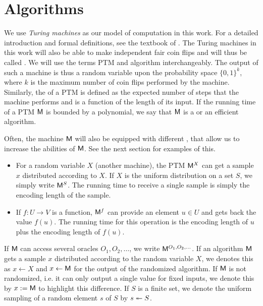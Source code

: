 \section{Algorithms}
We use \emph{Turing machines} as our model of computation in this
work. For a detailed introduction and formal definitions, see
the textbook of \citeauthor{papadimitriou1994complexity}
\cite{papadimitriou1994complexity}. The Turing machines in this work
will also be able to make independent fair coin flips and will thus be
called . We will use the
terms \ac{PTM} and algorithm interchangeably.  The output of such a
machine is thus a random variable upon the probability space
$\{0,1\}^{k}$, where $k$ is the maximum number of coin flips performed
by the machine. Similarly, the  of a \ac{PTM} is defined
as the expected number of steps that the machine performs and is a
function of the length of its input. If the running time of a \ac{PTM} $\mathsf{M}$ is
bounded by a polynomial, we say that $\mathsf{M}$ is a  or an
efficient algorithm.

Often, the machine $\mathsf{M}$ will also be equipped with different
, that allow us to increase the abilities of $\mathsf{M}$. See the
next section for examples of this. 
\begin{itemize}
\item For a random variable $X$ (\eg another machine), the PTM $\mathsf{M}^{X}$
  can get a sample $x$ distributed according to $X$. If $X$ is the
  uniform distribution on a set $S$, we simply write
  $\mathsf{M}^{S}$. The running time to receive
  a single sample is simply the encoding length of the sample.
\item If $f\colon U\to V$ is a function, $\mathsf{M}^{f}$ can provide an element
  $u\in U$ and gets back the value $f(u)$.  The running time for this
  operation is the encoding length of $u$ plus the encoding length of
  $f(u)$. 
\end{itemize}
If $\mathsf{M}$ can access several oracles $O_{1},O_{2},\ldots$, we write
$\mathsf{M}^{O_{1},O_{2},\ldots}$. If an algorithm $\mathsf{M}$ gets a sample $x$
distributed according to the random variable $X$, we denotes this as
$x\gets X$ and $x\gets \mathsf{M}$ for the output of the randomized
algorithm. If $\mathsf{M}$ is not randomized, i.e. it can only output a
single value for fixed inputs, we denote this by $x := \mathsf{M}$ to
highlight this difference. If $S$ is a finite set, we denote the
uniform sampling of a random element $s$ of $S$ by $s\twoheadleftarrow
S$. 

